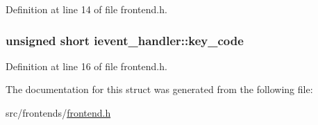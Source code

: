 Definition at line 14 of file frontend.\-h.

\hypertarget{structievent__handler_af2766b148965989b8d202b11b9e72f60}{
\subsubsection[{key\-\_\-code}]{\setlength{\rightskip}{0pt plus 5cm}unsigned short ievent\-\_\-handler\-::key\-\_\-code}}\label{structievent__handler_af2766b148965989b8d202b11b9e72f60}


Definition at line 16 of file frontend.\-h.



The documentation for this struct was generated from the following file\-:\begin{DoxyCompactItemize}
\item 
src/frontends/\hyperlink{frontend_8h}{frontend.\-h}\end{DoxyCompactItemize}
